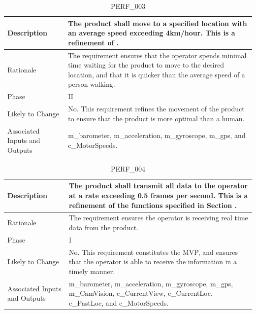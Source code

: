 \documentclass{article}
\begin{document}
\begin{table}[!h]
\begin{center}
\caption {PERF\_003} 
\label{PERF_003}
\begin{tabular}{ | m{3cm} | m{11cm} | }
\hline
Description & The product shall move to a specified location with an average speed exceeding 4km/hour. This is a refinement of \nameref{STA_002}. \\
\hline
Rationale & The requirement ensures that the operator spends minimal time waiting for the product to move to the desired location, and that it is quicker than the average speed of a person walking.  \\
\hline
Phase & II \\
\hline
Likely to Change & No. This requirement refines the movement of the product to ensure that the product is more optimal than a human. \\
\hline
Associated Inputs and Outputs & m\_barometer, m\_acceleration, m\_gyroscope, m\_gps, and c\_MotorSpeeds.  \\
\hline
\end{tabular}
\end{center}
\end{table}

\begin{table}[!h]
\begin{center}
\caption {PERF\_004} 
\label{PERF_004}
\begin{tabular}{ | m{3cm} | m{11cm} | }
\hline
Description & The product shall transmit all data to the operator at a rate exceeding 0.5 frames per second. This is a refinement of the functions specified in Section \nameref{subsec:ProdFunc}. \\
\hline
Rationale & The requirement ensures the operator is receiving real time data from the product. \\
\hline
Phase & I \\
\hline
Likely to Change & No. This requirement constitutes the MVP, and ensures that the operator is able to receive the information in a timely manner. \\
\hline
Associated Inputs and Outputs & m\_barometer, m\_acceleration, m\_gyroscope, m\_gps, m\_CamVision, c\_CurrentView, c\_CurrentLoc, c\_PastLoc, and c\_MotorSpeeds.  \\
\hline
\end{tabular}
\end{center}
\end{table}
\end{document}
